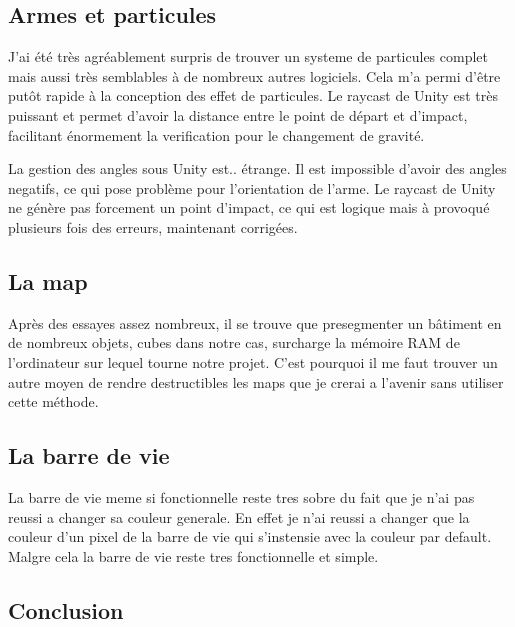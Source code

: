 ﻿\documentclass{article}
\begin{document}
\subsection{Armes et particules}
J'ai été très agréablement surpris de trouver un systeme de particules complet mais aussi très semblables à de nombreux autres logiciels. Cela m'a permi d'être putôt rapide à la conception des effet de particules. Le raycast de Unity est très puissant et permet d'avoir la distance entre le point de départ et d'impact, facilitant énormement la verification pour le changement de gravité.

La gestion des angles sous Unity est.. étrange. Il est impossible d'avoir des angles negatifs, ce qui pose problème pour l'orientation de l'arme. Le raycast de Unity ne génère pas forcement un point d'impact, ce qui est logique mais à provoqué plusieurs fois des erreurs, maintenant corrigées.

\subsection {La map}
Après des essayes assez nombreux, il se trouve que presegmenter un bâtiment en de nombreux objets, cubes dans notre cas, surcharge la mémoire RAM de l'ordinateur sur lequel tourne notre projet.
C'est pourquoi il me faut trouver un autre moyen de rendre destructibles les maps que je crerai a l'avenir sans utiliser cette méthode.

\subsection {La barre de vie}
La barre de vie meme si fonctionnelle reste tres sobre du fait que je n'ai pas reussi a changer sa couleur generale.
En effet je n'ai reussi a changer que la couleur d'un pixel de la barre de vie qui s'instensie avec la couleur par default.
Malgre cela la barre de vie reste tres fonctionnelle et simple.

\subsection{Conclusion}
\end{document}
